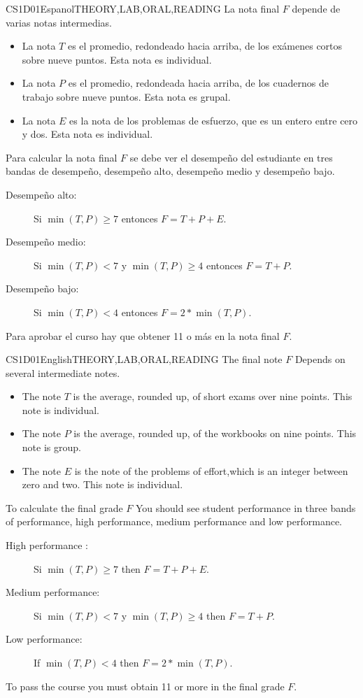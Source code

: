 \begin{evaluation}{CS1D01}{Espanol}{THEORY,LAB,ORAL,READING}
La nota final $F$ depende de varias notas intermedias.
	\begin{itemize}
		\item La nota $T$ es el promedio, redondeado hacia arriba, de los exámenes cortos sobre nueve puntos. Esta nota es individual.
		\item La nota $P$ es el promedio, redondeada hacia arriba, de los cuadernos de trabajo sobre nueve puntos. Esta nota es grupal.
		\item La nota $E$ es la nota de los problemas de esfuerzo, que es un entero entre cero y dos. Esta nota es individual. 
	\end{itemize}
	
	Para calcular la nota final $F$ se debe ver el desempeño del estudiante en tres bandas de desempeño, desempeño alto, desempeño medio y desempeño bajo.
	\begin{description}
		\item[Desempeño alto:] Si $\min(T,P)\geq 7$ entonces $F=T+P+E$.
		\item[Desempeño medio:] Si $\min(T,P)<7$ y $\min(T,P)\geq4$ entonces $F=T+P$.
		\item[Desempeño bajo:] Si $\min(T,P)<4$ entonces $F=2*\min(T,P)$.
	\end{description} 
	
	Para aprobar el curso hay que obtener 11 o más en la nota final $F$.
\end{evaluation}

\begin{evaluation}{CS1D01}{English}{THEORY,LAB,ORAL,READING}
The final note $F$ Depends on several intermediate notes.
	\begin{itemize}
		\item The note $T$ is the average, rounded up, of short exams over nine points. This note is individual.
		\item The note $P$ is the average, rounded up, of the workbooks on nine points. This note is group.
		\item The note $E$ is the note of the problems of effort,which is an integer between zero and two. This note is individual. 
	\end{itemize}
	
	To calculate the final grade $F$ You should see student performance in three bands of performance, high performance, medium performance and low performance.
	\begin{description}
		\item[High performance :] Si $\min(T,P)\geq 7$ then $F=T+P+E$.
		\item[Medium performance:] Si $\min(T,P)<7$ y $\min(T,P)\geq4$ then $F=T+P$.
		\item[Low performance:] If $\min(T,P)<4$ then $F=2*\min(T,P)$.
	\end{description} 
	
	To pass the course you must obtain 11 or more in the final grade $F$.
\end{evaluation}

